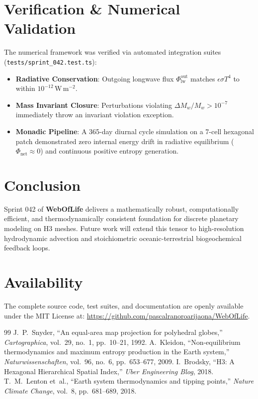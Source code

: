 \documentclass[10pt,twocolumn,a4paper]{article}
\begin{document}
\section{Verification \& Numerical Validation}
The numerical framework was verified via automated integration suites (\texttt{tests/sprint\_042.test.ts}):
\begin{itemize}
\item \textbf{Radiative Conservation}: Outgoing longwave flux $\Phi_{\mathrm{lw}}^{\mathrm{out}}$ matches $\epsilon \sigma T^4$ to within $10^{-12}\,\mathrm{W\,m^{-2}}$.
\item \textbf{Mass Invariant Closure}: Perturbations violating $\Delta M_w / M_w > 10^{-7}$ immediately throw an invariant violation exception.
\item \textbf{Monadic Pipeline}: A 365-day diurnal cycle simulation on a 7-cell hexagonal patch demonstrated zero internal energy drift in radiative equilibrium ($\Phi_{\mathrm{net}} \approx 0$) and continuous positive entropy generation.
\end{itemize}

\section{Conclusion}
Sprint 042 of \textbf{WebOfLife} delivers a mathematically robust, computationally efficient, and thermodynamically consistent foundation for discrete planetary modeling on H3 meshes. Future work will extend this tensor to high-resolution hydrodynamic advection and stoichiometric oceanic-terrestrial biogeochemical feedback loops.

\section*{Availability}
The complete source code, test suites, and documentation are openly available under the MIT License at:
\url{https://github.com/pascalranoroarijaona/WebOfLife}.

\begin{thebibliography}{99}
J.~P.~Snyder, ``An equal-area map projection for polyhedral globes,'' \textit{Cartographica}, vol.~29, no.~1, pp.~10--21, 1992.
A.~Kleidon, ``Non-equilibrium thermodynamics and maximum entropy production in the Earth system,'' \textit{Naturwissenschaften}, vol.~96, no.~6, pp.~653--677, 2009.
I.~Brodsky, ``H3: A Hexagonal Hierarchical Spatial Index,'' \textit{Uber Engineering Blog}, 2018.
T.~M.~Lenton et~al., ``Earth system thermodynamics and tipping points,'' \textit{Nature Climate Change}, vol.~8, pp.~681--689, 2018.
\end{thebibliography}
\end{document}
